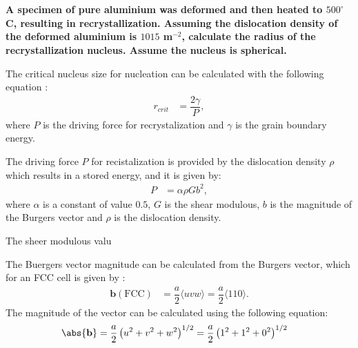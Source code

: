 \newpage
\section{}

\textbf{A specimen of pure aluminium was deformed and then heated to $500^{\circ}$C, resulting in recrystallization. Assuming the dislocation density of the deformed aluminium is $1015$ m$^{-2}$, calculate the radius of the recrystallization nucleus. Assume the nucleus is spherical.}

The critical nucleus size for nucleation can be calculated with the following equation \citet{rollett2017recrystallization}:
\begin{align}
    \label{eq:r_recrystallization}
    r_{crit}&=\dfrac{2\gamma}{P},
\end{align}
where $P$ is the driving force for recrystalization and $\gamma$ is the grain boundary energy.

The driving force $P$ for recistalization is provided by the dislocation density $\rho$ which results in a stored energy, and it is given by:
\begin{align}
    \label{eq:drivin_force}
    P&=\alpha \rho Gb^2,
\end{align}
where $\alpha$ is a constant of value $0.5$, $G$ is the shear modulous, $b$ is the magnitude of the Burgers vector and $\rho$ is the dislocation density.

The sheer modulous valu

The Buergers vector magnitude can be calculated from the Burgers vector, which for an FCC cell is given by \citet{callister2010materials}:
\begin{align}
    \label{eq:fcc_vector}
    \mathbf{b}(\text{FCC})&=\dfrac{a}{2}\langle uvw\rangle=\dfrac{a}{2}\langle110\rangle.
\end{align}
The magnitude of the vector can be calculated using the following equation:
\begin{align}
    \label{eq:vector_magnitude}
    \abs{\mathbf{b}}&=\dfrac{a}{2}\left(u^{2}+v^{2}+w^{2}\right)^{1/2}=\dfrac{a}{2}\left(1^{2}+1^{2}+0^{2}\right)^{1/2}
\end{align}
